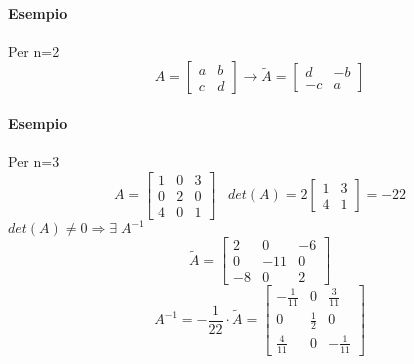 \documentclass[a4paper, 12pt]{report}
\begin{document}
    \paragraph{Esempio}Per n=2
    $$
    A=
    \begin{bmatrix}
        a & b\\
        c & d    
    \end{bmatrix}
    \rightarrow
    \tilde{A}=
    \begin{bmatrix}
        d & -b\\
        -c & a
    \end{bmatrix}
    $$
    \paragraph{Esempio} Per n=3
    $$A=
    \begin{bmatrix}
        1 & 0 & 3\\
        0 & 2 & 0\\
        4 & 0 & 1
    \end{bmatrix}
    \; \; \; det(A)= 2 
    \begin{bmatrix}
        1 & 3\\
        4 & 1
    \end{bmatrix}
    =-22
    $$
    $det(A)\neq 0 \Rightarrow \exists \; A^{-1}$
    $$
    \tilde{A}=
    \begin{bmatrix}
        2 & 0 & -6\\
        0 & -11 & 0\\
        -8 & 0 & 2
    \end{bmatrix}
    $$
    $$
    A^{-1}=-\frac{1}{22} \cdot \tilde{A}=
    \begin{bmatrix}
        -\frac{1}{11} & 0 & \frac{3}{11}\\
        0 & \frac{1}{2} & 0\\
        \frac{4}{11} & 0 & -\frac{1}{11}
    \end{bmatrix}
    $$
\end{document}
